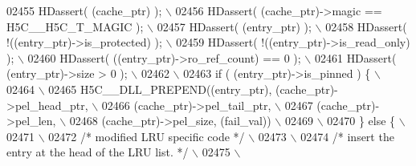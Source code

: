 \begin{DoxyCode}
02455 \textcolor{preprocessor}{    HDassert( (cache\_ptr) );                                               \(\backslash\)}
02456 \textcolor{preprocessor}{    HDassert( (cache\_ptr)->magic == H5C\_\_H5C\_T\_MAGIC );                    \(\backslash\)}
02457 \textcolor{preprocessor}{    HDassert( (entry\_ptr) );                                               \(\backslash\)}
02458 \textcolor{preprocessor}{    HDassert( !((entry\_ptr)->is\_protected) );                              \(\backslash\)}
02459 \textcolor{preprocessor}{    HDassert( !((entry\_ptr)->is\_read\_only) );                              \(\backslash\)}
02460 \textcolor{preprocessor}{    HDassert( ((entry\_ptr)->ro\_ref\_count) == 0 );                          \(\backslash\)}
02461 \textcolor{preprocessor}{    HDassert( (entry\_ptr)->size > 0 );                                     \(\backslash\)}
02462 \textcolor{preprocessor}{                                                                           \(\backslash\)}
02463 \textcolor{preprocessor}{    if ( (entry\_ptr)->is\_pinned ) \{                                        \(\backslash\)}
02464 \textcolor{preprocessor}{                                                                           \(\backslash\)}
02465 \textcolor{preprocessor}{        H5C\_\_DLL\_PREPEND((entry\_ptr), (cache\_ptr)->pel\_head\_ptr,           \(\backslash\)}
02466 \textcolor{preprocessor}{                         (cache\_ptr)->pel\_tail\_ptr,                        \(\backslash\)}
02467 \textcolor{preprocessor}{                         (cache\_ptr)->pel\_len,                             \(\backslash\)}
02468 \textcolor{preprocessor}{                         (cache\_ptr)->pel\_size, (fail\_val))                \(\backslash\)}
02469 \textcolor{preprocessor}{                                                                       \(\backslash\)}
02470 \textcolor{preprocessor}{    \} else \{                                                               \(\backslash\)}
02471 \textcolor{preprocessor}{                                                                           \(\backslash\)}
02472 \textcolor{preprocessor}{        }\textcolor{comment}{/* modified LRU specific code */}\textcolor{preprocessor}{                                   \(\backslash\)}
02473 \textcolor{preprocessor}{                                                                           \(\backslash\)}
02474 \textcolor{preprocessor}{        }\textcolor{comment}{/* insert the entry at the head of the LRU list. */}\textcolor{preprocessor}{                \(\backslash\)}
02475 \textcolor{preprocessor}{                                                                           \(\backslash\)}

\end{DoxyCode}
